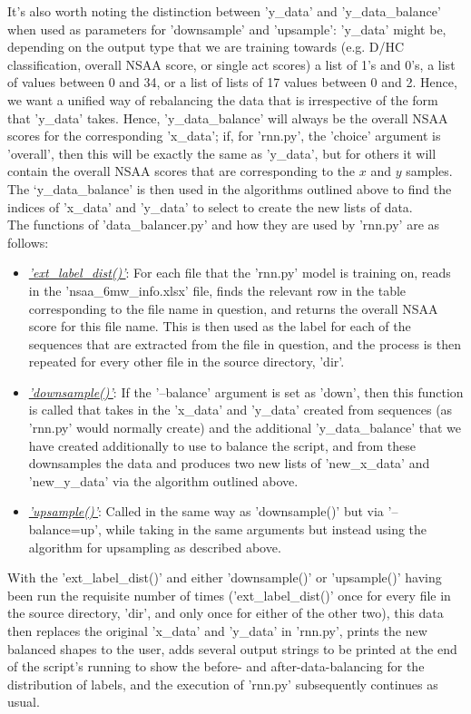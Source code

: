 \documentclass[12pt,twoside]{report}
\begin{document}
\quad It's also worth noting the distinction between 'y\_data' and 'y\_data\_balance' when used as parameters for 'downsample' and 'upsample': 'y\_data' might be, depending on the output type that we are training towards (e.g. D/HC classification, overall NSAA score, or single act scores) a list of 1's and 0's, a list of values between 0 and 34, or a list of lists of 17 values between 0 and 2. Hence, we want a unified way of rebalancing the data that is irrespective of the form that 'y\_data' takes. Hence, 'y\_data\_balance' will always be the overall NSAA scores for the corresponding 'x\_data'; if, for 'rnn.py', the 'choice' argument is 'overall', then this will be exactly the same as 'y\_data', but for others it will contain the overall NSAA scores that are corresponding to the $x$ and $y$ samples. The ‘y\_data\_balance' is then used in the algorithms outlined above to find the indices of 'x\_data' and 'y\_data' to select to create the new lists of data.\\

\quad The functions of 'data\_balancer.py' and how they are used by 'rnn.py' are as follows:

\begin{itemize}
	\item \underline{\textit{'ext\_label\_dist()'}}: For each file that the 'rnn.py' model is training on, reads in the 'nsaa\_6mw\_info.xlsx' file, finds the relevant row in the table corresponding to the file name in question, and returns the overall NSAA score for this file name. This is then used as the label for each of the sequences that are extracted from the file in question, and the process is then repeated for every other file in the source directory, 'dir'.
	\item \underline{\textit{'downsample()'}}: If the '--balance' argument is set as 'down', then this function is called that takes in the 'x\_data' and 'y\_data' created from sequences (as 'rnn.py' would normally create) and the additional 'y\_data\_balance' that we have created additionally to use to balance the script, and from these downsamples the data and produces two new lists of 'new\_x\_data' and 'new\_y\_data' via the algorithm outlined above.
	\item \underline{\textit{'upsample()'}}: Called in the same way as 'downsample()' but via '--balance=up', while taking in the same arguments but instead using the algorithm for upsampling as described above.
\end{itemize}

\quad With the 'ext\_label\_dist()' and either 'downsample()' or 'upsample()' having been run the requisite number of times ('ext\_label\_dist()' once for every file in the source directory, 'dir', and only once for either of the other two), this data then replaces the original 'x\_data' and 'y\_data' in 'rnn.py', prints the new balanced shapes to the user, adds several output strings to be printed at the end of the script's running to show the before- and after-data-balancing for the distribution of labels, and the execution of 'rnn.py' subsequently continues as usual.
\end{document}
